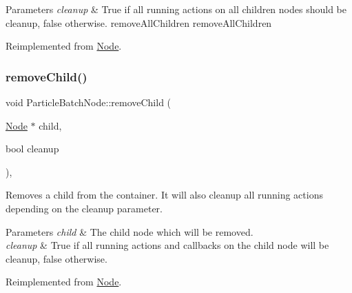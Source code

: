 \begin{DoxyParams}{Parameters}
{\em cleanup} & True if all running actions on all children nodes should be cleanup, false otherwise.  remove\+All\+Children  remove\+All\+Children \\
\hline
\end{DoxyParams}


Reimplemented from \hyperlink{classNode_aca66e2b385c3dbf1a6f55627c4a13192}{Node}.

\mbox{\label{classParticleBatchNode_a44ecab9f55fdf0196cb40fd39781bea6}} 
\subsubsection{\texorpdfstring{remove\+Child()}{removeChild()}\hspace{0.1cm}{\footnotesize\ttfamily [1/2]}}
{\footnotesize\ttfamily void Particle\+Batch\+Node\+::remove\+Child (\begin{DoxyParamCaption}\item[{\hyperlink{classNode}{Node} $\ast$}]{child,  }\item[{bool}]{cleanup }\end{DoxyParamCaption})\hspace{0.3cm}{\ttfamily [override]}, {\ttfamily [virtual]}}

Removes a child from the container. It will also cleanup all running actions depending on the cleanup parameter.


\begin{DoxyParams}{Parameters}
{\em child} & The child node which will be removed. \\
\hline
{\em cleanup} & True if all running actions and callbacks on the child node will be cleanup, false otherwise. \\
\hline
\end{DoxyParams}


Reimplemented from \hyperlink{classNode_a872d4a7d389b26b0c6ad7ed99c8b1b65}{Node}.

\mbox{\label{classParticleBatchNode_a384b404f2f29463180517528f6f350dc}} 
